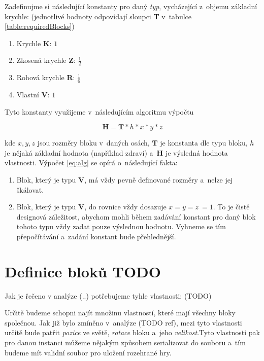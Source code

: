 Zadefinujme si následující konstanty pro daný \textit{typ}, vycházející z~objemu základní krychle: (jednotlivé hodnoty odpovídají sloupci \textbf{T} v~tabulce \ref{table:requiredBlocks})

\begin{enumerate}
	\item Krychle \textbf{K}: $1$
	\item Zkosená krychle \textbf{Z}: $\frac{1}{2}$
	\item Rohová krychle \textbf{R}: $\frac{1}{6}$
	\item Vlastní \textbf{V}: $1$
\end{enumerate}

Tyto konstanty využijeme v~následujícím algoritmu výpočtu

\begin{equation}\label{eq:alg}
	\bm H = \bm T * h  * x * y * z
\end{equation}

kde $x, y, z$ jsou rozměry bloku v~daných osách, $\bm T$ je konstanta dle typu bloku, $h$ je nějaká základní hodnota (například zdraví) a~$\bm H$ je výsledná hodnota vlastnosti. Výpočet \ref{eq:alg} se opírá o~následující fakta:

\begin{enumerate}
	\item Blok, který je typu \textbf{V}, má vždy pevně definované rozměry a~nelze jej škálovat.
	\item Blok, který je typu \textbf{V}, do rovnice vždy dosazuje $ x = y = z~= 1$.
	\subitem To je čistě designová záležitost, abychom mohli během zadávání konstant pro daný blok tohoto typu vždy zadat pouze výslednou hodnotu. Vyhneme se tím přepočítávání a~zadání konstant bude přehlednější.
\end{enumerate}






\section{Definice bloků TODO}

Jak je řečeno v analýze (..) potřebujeme tyhle vlastnosti: (TODO)

Určitě budeme schopni najít množinu vlastností, které mají všechny bloky společnou. Jak již bylo zmíněno v~analýze (TODO ref), mezi tyto vlastnosti určitě bude patřit  \textit{pozice} ve světě, \textit{rotace} bloku a~jeho \textit{velikost}.Tyto vlastnosti pak pro danou instanci můžeme nějakým způsobem serializovat do souboru a~tím budeme mít validní soubor pro uložení rozehrané hry. 

